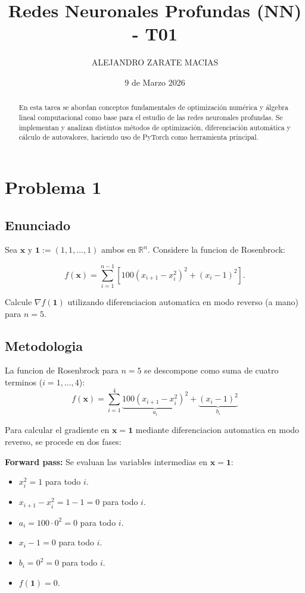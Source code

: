 \documentclass{article}
\title{Redes Neuronales Profundas (NN) - T01}
\author{ALEJANDRO ZARATE MACIAS}
\date{9 de Marzo 2026}
\begin{document}
\maketitle

\begin{abstract}
En esta tarea se abordan conceptos fundamentales de optimización numérica y álgebra lineal computacional como base para el estudio de las redes neuronales profundas. Se implementan y analizan distintos métodos de optimización, diferenciación automática y cálculo de autovalores, haciendo uso de PyTorch como herramienta principal.
\end{abstract}


\section{Problema 1}

\subsection{Enunciado}

Sea $\mathbf{x}$ y $\mathbf{1} := (1,1,\ldots,1)$ ambos en $\mathbb{R}^n$. Considere la funcion de Rosenbrock:

\[
f(\mathbf{x}) = \sum_{i=1}^{n-1} \left[ 100(x_{i+1} - x_i^2)^2 + (x_i - 1)^2 \right].
\tag{1}
\]

Calcule $\nabla f(\mathbf{1})$ utilizando diferenciacion automatica en modo reverso (a mano) para $n = 5$.

\subsection{Metodologia}

La funcion de Rosenbrock para $n=5$ se descompone como suma de cuatro terminos ($i = 1, \ldots, 4$):
\[
f(\mathbf{x}) = \sum_{i=1}^{4} \underbrace{100(x_{i+1} - x_i^2)^2}_{a_i} + \underbrace{(x_i - 1)^2}_{b_i}
\]

Para calcular el gradiente en $\mathbf{x} = \mathbf{1}$ mediante diferenciacion automatica en modo reverso, se procede en dos fases:

\textbf{Forward pass:} Se evaluan las variables intermedias en $\mathbf{x} = \mathbf{1}$:
\begin{itemize}
    \item $x_i^2 = 1$ para todo $i$.
    \item $x_{i+1} - x_i^2 = 1 - 1 = 0$ para todo $i$.
    \item $a_i = 100 \cdot 0^2 = 0$ para todo $i$.
    \item $x_i - 1 = 0$ para todo $i$.
    \item $b_i = 0^2 = 0$ para todo $i$.
    \item $f(\mathbf{1}) = 0$.
\end{itemize}
\end{document}
